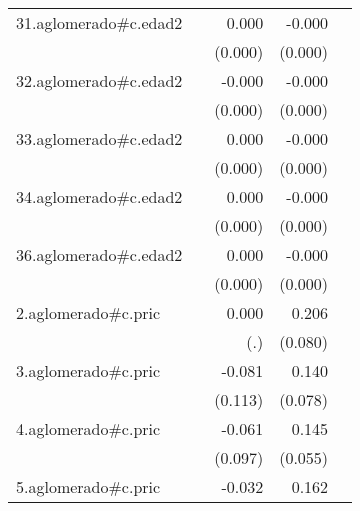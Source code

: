 {\begin{longtable}{l*{4}{D{.}{.}{-1}}}
\addlinespace
31.aglomerado#c.edad2&                     &       0.000         &      -0.000\sym{***}&                     \\
            &                     &     (0.000)         &     (0.000)         &                     \\
\addlinespace
32.aglomerado#c.edad2&                     &      -0.000         &      -0.000\sym{***}&                     \\
            &                     &     (0.000)         &     (0.000)         &                     \\
\addlinespace
33.aglomerado#c.edad2&                     &       0.000         &      -0.000\sym{*}  &                     \\
            &                     &     (0.000)         &     (0.000)         &                     \\
\addlinespace
34.aglomerado#c.edad2&                     &       0.000         &      -0.000         &                     \\
            &                     &     (0.000)         &     (0.000)         &                     \\
\addlinespace
36.aglomerado#c.edad2&                     &       0.000         &      -0.000         &                     \\
            &                     &     (0.000)         &     (0.000)         &                     \\
\addlinespace
2.aglomerado#c.pric&                     &       0.000         &       0.206\sym{**} &                     \\
            &                     &         (.)         &     (0.080)         &                     \\
\addlinespace
3.aglomerado#c.pric&                     &      -0.081         &       0.140         &                     \\
            &                     &     (0.113)         &     (0.078)         &                     \\
\addlinespace
4.aglomerado#c.pric&                     &      -0.061         &       0.145\sym{**} &                     \\
            &                     &     (0.097)         &     (0.055)         &                     \\
\addlinespace
5.aglomerado#c.pric&                     &      -0.032         &       0.162\sym{*}  &                     \\

\end{longtable}}
